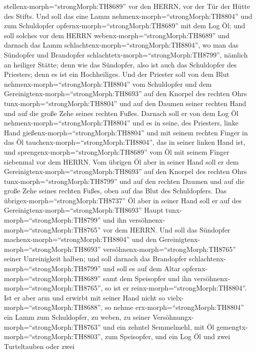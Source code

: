 stellenx-morph=``strongMorph:TH8689'' vor den HERRN, vor der Tür der
Hütte des Stifts.  Und soll das eine Lamm
nehmenx-morph=``strongMorph:TH8804'' und zum Schuldopfer
opfernx-morph=``strongMorph:TH8689'' mit dem Log Öl; und soll solches
vor dem HERRN webenx-morph=``strongMorph:TH8689''  und
darnach das Lamm schlachtenx-morph=``strongMorph:TH8804'', wo man das
Sündopfer und Brandopfer schlachtetx-morph=``strongMorph:TH8799'',
nämlich an heiliger Stätte; denn wie das Sündopfer, also ist auch das
Schuldopfer des Priesters; denn es ist ein Hochheiliges. 
Und der Priester soll von dem Blut nehmenx-morph=``strongMorph:TH8804''
vom Schuldopfer und dem Gereinigtenx-morph=``strongMorph:TH8693'' auf
den Knorpel des rechten Ohrs tunx-morph=``strongMorph:TH8804'' und auf
den Daumen seiner rechten Hand und auf die große Zehe seines rechten
Fußes.  Darnach soll er von dem Log Öl
nehmenx-morph=``strongMorph:TH8804'' und es in seine, des Priesters,
linke Hand gießenx-morph=``strongMorph:TH8804''  und mit
seinem rechten Finger in das Öl tauchenx-morph=``strongMorph:TH8804'',
das in seiner linken Hand ist, und
sprengenx-morph=``strongMorph:TH8689'' vom Öl mit seinem Finger
siebenmal vor dem HERRN.  Vom übrigen Öl aber in seiner
Hand soll er dem Gereinigtenx-morph=``strongMorph:TH8693'' auf den
Knorpel des rechten Ohrs tunx-morph=``strongMorph:TH8799'' und auf den
rechten Daumen und auf die große Zehe seines rechten Fußes, oben auf das
Blut des Schuldopfers.  Das
übrigex-morph=``strongMorph:TH8737'' Öl aber in seiner Hand soll er auf
des Gereinigtenx-morph=``strongMorph:TH8693'' Haupt
tunx-morph=``strongMorph:TH8799'' und ihn
versöhnenx-morph=``strongMorph:TH8765'' vor dem HERRN.  Und
soll das Sündopfer machenx-morph=``strongMorph:TH8804'' und den
Gereinigtenx-morph=``strongMorph:TH8693''
versöhnenx-morph=``strongMorph:TH8765'' seiner Unreinigkeit halben; und
soll darnach das Brandopfer schlachtenx-morph=``strongMorph:TH8799''
 und soll es auf dem Altar
opfernx-morph=``strongMorph:TH8689'' samt dem Speisopfer und ihn
versöhnenx-morph=``strongMorph:TH8765'', so ist er
reinx-morph=``strongMorph:TH8804''.  Ist er aber arm und
erwirbt mit seiner Hand nicht so vielx-morph=``strongMorph:TH8688'', so
nehme erx-morph=``strongMorph:TH8804'' ein Lamm zum Schuldopfer, zu
weben, zu seiner Versöhnungx-morph=``strongMorph:TH8763'' und ein
zehntel Semmelmehl, mit Öl gemengtx-morph=``strongMorph:TH8803'', zum
Speisopfer, und ein Log Öl  und zwei Turteltauben oder zwei
